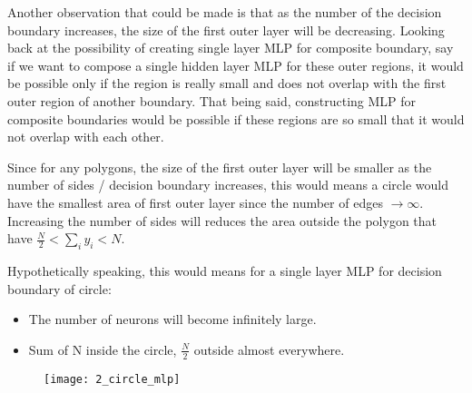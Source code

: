 \hfill\break
Another observation that could be made is that as the number of the decision boundary increases, the size of the first outer layer will be decreasing. Looking back at the possibility of creating single layer MLP for composite boundary, say if we want to compose a single hidden layer MLP for these outer regions, it would be possible only if the region is really small and does not overlap with the first outer region of another boundary. That being said, constructing MLP for composite boundaries would be possible if these regions are so small that it would not overlap with each other.

\hfill\break
Since for any polygons, the size of the first outer layer will be smaller as the number of sides / decision boundary increases, this would means a circle would have the smallest area of first outer layer since the number of edges $\rightarrow\infty$. Increasing the number of sides will reduces the area outside the polygon that have $\frac{N}{2}<\sum_{i}{y_i}<N$.

\hfill\break
Hypothetically speaking, this would means for a single layer MLP for decision boundary of circle:
\begin{itemize}
	\item The number of neurons will become infinitely large.
	\item Sum of N inside the circle, $\frac{N}{2}$ outside almost everywhere.
\end{itemize}

\begin{figure}[H]
	\centering
	\texttt{[image: 2\_circle\_mlp]}
\end{figure}







